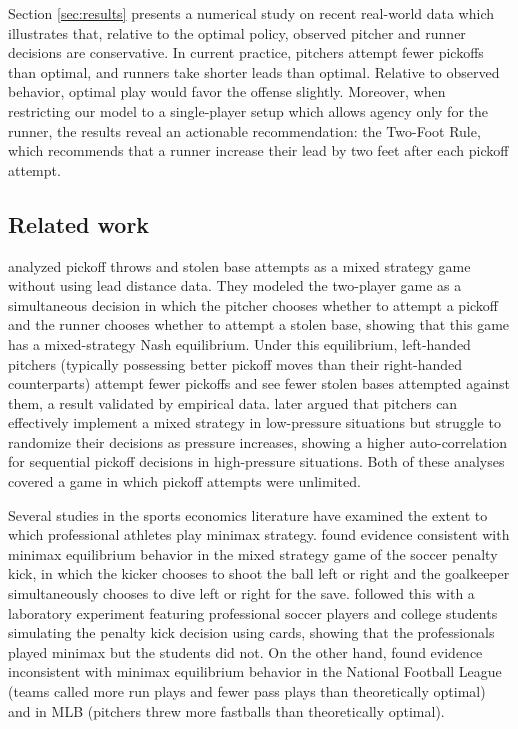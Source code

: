 \documentclass[11pt]{article}
\begin{document}
    Section \ref{sec:results} presents a numerical study on recent real-world data which illustrates that, relative to the optimal policy, observed pitcher and runner decisions are conservative. In current practice, pitchers attempt fewer pickoffs than optimal, and runners take shorter leads than optimal. Relative to observed behavior, optimal play would favor the offense slightly. Moreover, when restricting our model to a single-player setup which allows agency only for the runner, the results reveal an actionable recommendation: the Two-Foot Rule, which recommends that a runner increase their lead by two feet after each pickoff attempt.

    \subsection{Related work}

    \textcite{downey_pick_2015} analyzed pickoff throws and stolen base attempts as a mixed strategy game without using lead distance data. They modeled the two-player game as a simultaneous decision in which the pitcher chooses whether to attempt a pickoff and the runner chooses whether to attempt a stolen base, showing that this game has a mixed-strategy Nash equilibrium. Under this equilibrium, left-handed pitchers (typically possessing better pickoff moves than their right-handed counterparts) attempt fewer pickoffs and see fewer stolen bases attempted against them, a result validated by empirical data. \textcite{downey_pressure_2019} later argued that pitchers can effectively implement a mixed strategy in low-pressure situations but struggle to randomize their decisions as pressure increases, showing a higher auto-correlation for sequential pickoff decisions in high-pressure situations. Both of these analyses covered a game in which pickoff attempts were unlimited.

    Several studies in the sports economics literature have examined the extent to which professional athletes play minimax strategy. \textcite{palacios-huerta_professionals_2003} found evidence consistent with minimax equilibrium behavior in the mixed strategy game of the soccer penalty kick, in which the kicker chooses to shoot the ball left or right and the goalkeeper simultaneously chooses to dive left or right for the save. \textcite{palacios-huerta_experientia_2008} followed this with a laboratory experiment featuring professional soccer players and college students simulating the penalty kick decision using cards, showing that the professionals played minimax but the students did not. On the other hand, \textcite{kovash_professionals_2009} found evidence inconsistent with minimax equilibrium behavior in the National Football League (teams called more run plays and fewer pass plays than theoretically optimal) and in MLB (pitchers threw more fastballs than theoretically optimal).
\end{document}
